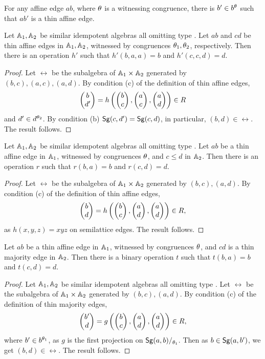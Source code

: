 \documentclass[11pt]{article}
\begin{document}
\begin{corollary}\label{cor:thin-affine}
For any affine edge $ab$, where $\theta$ is a witnessing congruence, there is $b'\in b^\theta$ 
such that $ab'$ is a thin affine edge.
\end{corollary}

\begin{lemma}\label{lem:thin-affine-pair}
Let ${\mathbb A}_1,{\mathbb A}_2$ be similar idempotent algebras all omitting type \one.
Let $ab$ and $cd$ be thin affine edges in ${\mathbb A}_1,{\mathbb A}_2$, witnessed by congruences 
$\theta_1,\theta_2$, respectively. Then there is an operation $h'$ such that $h'(b,a,a)=b$ 
and $h'(c,c,d)=d$.
\end{lemma}

\begin{proof}
Let $\rel$ be the subalgebra of ${\mathbb A}_1\times{\mathbb A}_2$ generated by $(b,c),(a,c),(a,d)$. 
By condition (c) of the definition of thin affine edges,
$$
\cl b{d'}=h\left(\cl bc,\cl ac,\cl ad\right)\in\rel
$$
and $d'\in d^{\theta_2}$. By condition (b) ${\sf Sg}(c,d')={\sf Sg}(c,d)$, in particular, 
$(b,d)\in\rel$. The result follows.
\end{proof}

\begin{lemma}\label{lem:affine-sl}
Let ${\mathbb A}_1,{\mathbb A}_2$ be similar idempotent algebras all omitting type \one.
Let $ab$ be a thin affine edge in ${\mathbb A}_1$, witnessed by congruences $\theta$, and $c\le d$ in $
{\mathbb A}_2$. Then there is an operation $r$ such that $r(b,a)=b$ and $r(c,d)=d$.
\end{lemma}

\begin{proof}
Let $\rel$ be the subalgebra of ${\mathbb A}_1\times{\mathbb A}_2$ generated by $(b,c),(a,d)$. 
By condition (c) of the definition of thin affine edges,
$$
\cl bd=h\left(\cl bc,\cl ad,\cl ad\right)\in\rel,
$$
as $h(x,y,z)=xyz$ on semilattice edges. The result follows.
\end{proof}

\begin{lemma}\label{lem:affine-maj}
Let $ab$ be a thin affine edge in ${\mathbb A}_1$, witnessed by congruences $\theta$, and $cd$ 
is a thin majority edge in ${\mathbb A}_2$. Then there is a binary operation $t$ such that 
$t(b,a)=b$ and $t(c,d)=d$.
\end{lemma}

\begin{proof}
Let ${\mathbb A}_1,{\mathbb A}_2$ be similar idempotent algebras all omitting type \one.
Let $\rel$ be the subalgebra of ${\mathbb A}_1\times{\mathbb A}_2$ generated by $(b,c),(a,d)$. 
By condition (c) of the definition of thin majority edges,
$$
\cl {b'}d=g\left(\cl bc,\cl ad,\cl ad\right)\in\rel,
$$
where $b'\in b^{\theta_1}$, as $g$ is the first projection on $\Sg{a,b}\fac{\th_1}$. 
Then as $b\in{\sf Sg}(a,b')$, we get $(b,d)\in\rel$. The result follows.
\end{proof}
\end{document}
